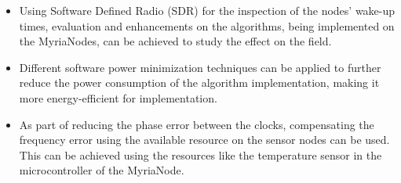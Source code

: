 \documentclass[journal]{IEEEtran}
\begin{document}
\begin{itemize}
 \item
Using Software Defined Radio (SDR) for the inspection of the nodes' wake-up times, evaluation and enhancements on the algorithms, being
implemented on the MyriaNodes, can be achieved to study the effect on the field.
\item
Different software power minimization techniques can be applied to further reduce the
power consumption of the algorithm implementation, making it more
energy-efficient for implementation.
\item As part of reducing the phase error between the clocks, compensating the frequency error using the available resource on the sensor nodes can be used. This can be achieved using the resources like the temperature sensor in the
microcontroller of the MyriaNode.
\end{itemize}
\end{document}
